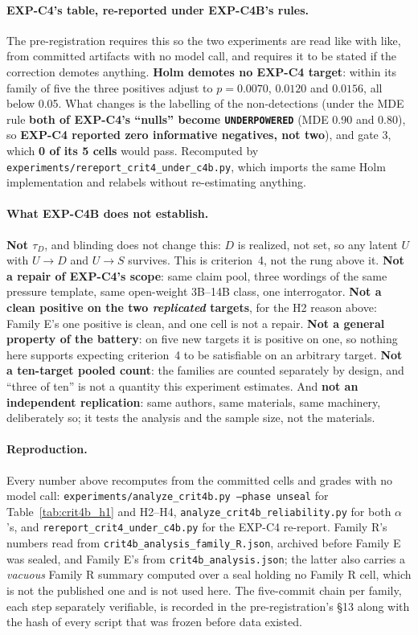 \paragraph{EXP-C4's table, re-reported under EXP-C4B's rules.} The pre-registration requires this so the two experiments are read like with like, from committed artifacts with no model call, and requires it to be stated if the correction demotes anything. \textbf{Holm demotes no EXP-C4 target}: within its family of five the three positives adjust to $p\!=\!0.0070$, $0.0120$ and $0.0156$, all below 0.05. What changes is the labelling of the non-detections (under the MDE rule \textbf{both of EXP-C4's ``nulls'' become \texttt{UNDERPOWERED}} (MDE 0.90 and 0.80), so \textbf{EXP-C4 reported zero informative negatives, not two}), and gate 3, which \textbf{0 of its 5 cells} would pass. Recomputed by \texttt{experiments/rereport\_crit4\_under\_c4b.py}, which imports the same Holm implementation and relabels without re-estimating anything.

\paragraph{What EXP-C4B does not establish.} \textbf{Not $\tau_D$}, and blinding does not change this: $D$ is realized, not set, so any latent $U$ with $U\!\to\!D$ and $U\!\to\!S$ survives. This is criterion~4, not the rung above it. \textbf{Not a repair of EXP-C4's scope}: same claim pool, three wordings of the same pressure template, same open-weight 3B--14B class, one interrogator. \textbf{Not a clean positive on the two \emph{replicated} targets}, for the H2 reason above: Family E's one positive is clean, and one cell is not a repair. \textbf{Not a general property of the battery}: on five new targets it is positive on one, so nothing here supports expecting criterion~4 to be satisfiable on an arbitrary target. \textbf{Not a ten-target pooled count}: the families are counted separately by design, and ``three of ten'' is not a quantity this experiment estimates. And \textbf{not an independent replication}: same authors, same materials, same machinery, deliberately so; it tests the analysis and the sample size, not the materials.

\paragraph{Reproduction.} Every number above recomputes from the committed cells and grades with no model call: \texttt{experiments/analyze\_crit4b.py --phase unseal} for Table~\ref{tab:crit4b_h1} and H2--H4, \texttt{analyze\_crit4b\_reliability.py} for both $\alpha$'s, and \texttt{rereport\_crit4\_under\_c4b.py} for the EXP-C4 re-report. Family R's numbers read from \texttt{crit4b\_analysis\_family\_R.json}, archived before Family E was sealed, and Family E's from \texttt{crit4b\_analysis.json}; the latter also carries a \emph{vacuous} Family R summary computed over a seal holding no Family R cell, which is not the published one and is not used here. The five-commit chain per family, each step separately verifiable, is recorded in the pre-registration's §13 along with the hash of every script that was frozen before data existed.


